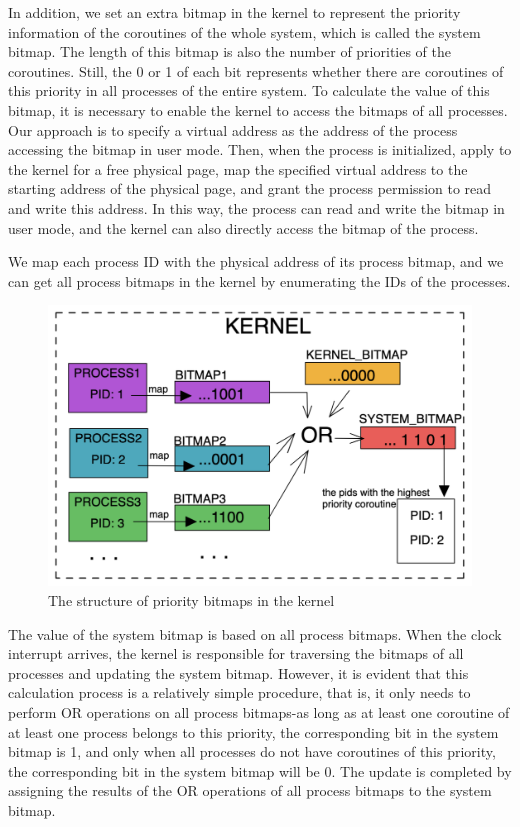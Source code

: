 \documentclass[10pt]{article}
\begin{document}
In addition, we set an extra bitmap in the kernel to represent the priority information of the coroutines of the whole system, which is called the system bitmap. The length of this bitmap is also the number of priorities of the coroutines. Still, the 0 or 1 of each bit represents whether there are coroutines of this priority in all processes of the entire system. To calculate the value of this bitmap, it is necessary to enable the kernel to access the bitmaps of all processes. Our approach is to specify a virtual address as the address of the process accessing the bitmap in user mode. Then, when the process is initialized, apply to the kernel for a free physical page, map the specified virtual address to the starting address of the physical page, and grant the process permission to read and write this address. In this way, the process can read and write the bitmap in user mode, and the kernel can also directly access the bitmap of the process.

We map each process ID with the physical address of its process bitmap, and we can get all process bitmaps in the kernel by enumerating the IDs of the processes.

\begin{figure}[ht]
\begin{center}
\centerline{\includegraphics[width=\columnwidth]{bitmap.png}}
\caption{The structure of priority bitmaps in the kernel}
\label{bitmap}
\end{center}
\end{figure}

The value of the system bitmap is based on all process bitmaps. When the clock interrupt arrives, the kernel is responsible for traversing the bitmaps of all processes and updating the system bitmap. However, it is evident that this calculation process is a relatively simple procedure, that is, it only needs to perform OR operations on all process bitmaps-as long as at least one coroutine of at least one process belongs to this priority, the corresponding bit in the system bitmap is 1, and only when all processes do not have coroutines of this priority, the corresponding bit in the system bitmap will be 0. The update is completed by assigning the results of the OR operations of all process bitmaps to the system bitmap.
\end{document}

